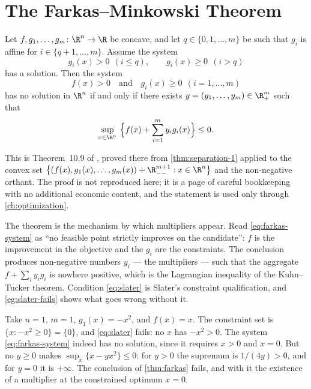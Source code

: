 \section{The Farkas--Minkowski Theorem}\label{sec:cvx-farkas}

\begin{theorem}\label{thm:farkas}
	Let $f,g_1,\dots,g_m\colon\R^n\to\R$ be concave, and let
	$q\in\{0,1,\dots,m\}$ be such that $g_i$ is affine for
	$i\in\{q+1,\dots,m\}$. Assume the system
	\begin{equation}\label{eq:slater}
		g_i(x)>0\ \ (i\leq q),\qquad g_i(x)\geq0\ \ (i>q)
	\end{equation}
	has a solution. Then the system
	\begin{equation}\label{eq:farkas-system}
		f(x)>0\quad\text{and}\quad g_i(x)\geq0\ \ (i=1,\dots,m)
	\end{equation}
	has no solution in $\R^n$ if and only if there exists
	$y=(y_1,\dots,y_m)\in\R^m_+$ such that
	\[
		\sup_{x\in\R^n}\ \Bigl\{f(x)+\sum_{i=1}^{m}y_ig_i(x)\Bigr\}\leq0 .
	\]
\end{theorem}

This is Theorem~10.9 of \textcite[p.~353]{fukuda2026notes}, proved there from
\autoref{thm:separation-1} applied to the convex set
$\bigl\{(f(x),g_1(x),\dots,g_m(x))+\R^{m+1}_{--} : x\in\R^n\bigr\}$ and the
non-negative orthant. The proof is not reproduced here; it is a page of careful
bookkeeping with no additional economic content, and the statement is used only
through \autoref{ch:optimization}.

The theorem is the mechanism by which multipliers appear. Read
\eqref{eq:farkas-system} as ``no feasible point strictly improves on the
candidate'': $f$ is the improvement in the objective and the $g_i$ are the
constraints. The conclusion produces non-negative numbers $y_i$ --- the
multipliers --- such that the aggregate $f+\sum_iy_ig_i$ is nowhere positive,
which is the Lagrangian inequality of the Kuhn--Tucker theorem. Condition
\eqref{eq:slater} is Slater's constraint qualification, and
\autoref{eg:slater-fails} shows what goes wrong without it.

\begin{eg}\label{eg:slater-fails}
	Take $n=1$, $m=1$, $g_1(x)=-x^2$, and $f(x)=x$. The constraint set is
	$\{x : -x^2\geq0\}=\{0\}$, and \eqref{eq:slater} fails: no $x$ has $-x^2>0$. The
	system \eqref{eq:farkas-system} indeed has no solution, since it requires
	$x>0$ and $x=0$. But no $y\geq0$ makes
	$\sup_x\{x-yx^2\}\leq0$: for $y>0$ the supremum is $1/(4y)>0$, and for $y=0$ it
	is $+\infty$. The conclusion of \autoref{thm:farkas} fails, and with it the
	existence of a multiplier at the constrained optimum $x=0$.
\end{eg}

